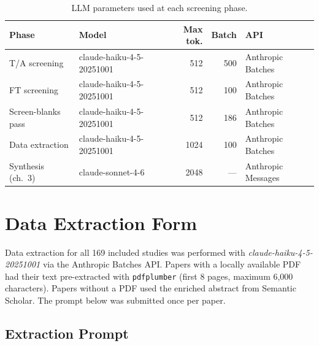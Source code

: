 \begin{table}[htbp]
\centering
\caption{LLM parameters used at each screening phase.}
\label{tab:app-prompt-params}
\small
\setlength{\tabcolsep}{4pt}
\begin{tabular}{l l r r l}
\toprule
\textbf{Phase} & \textbf{Model} & \textbf{Max tok.} &
  \textbf{Batch} & \textbf{API} \\
\midrule
T/A screening      & claude-haiku-4-5-20251001 & 512  & 500 & Anthropic Batches \\
FT screening       & claude-haiku-4-5-20251001 & 512  & 100 & Anthropic Batches \\
Screen-blanks pass & claude-haiku-4-5-20251001 & 512  & 186 & Anthropic Batches \\
Data extraction    & claude-haiku-4-5-20251001 & 1024 & 100 & Anthropic Batches \\
Synthesis (ch.~3)  & claude-sonnet-4-6         & 2048 & --- & Anthropic Messages \\
\bottomrule
\end{tabular}
\end{table}


\chapter{Data Extraction Form}
\label{app:G}

Data extraction for all 169 included studies was performed with
\textit{claude-haiku-4-5-20251001} via the Anthropic Batches API. Papers
with a locally available PDF had their text pre-extracted with
\texttt{pdfplumber} (first 8 pages, maximum 6,000 characters). Papers
without a PDF used the enriched abstract from Semantic Scholar.
The prompt below was submitted once per paper.

\section{Extraction Prompt}
\label{app:slr-extraction-prompt}

